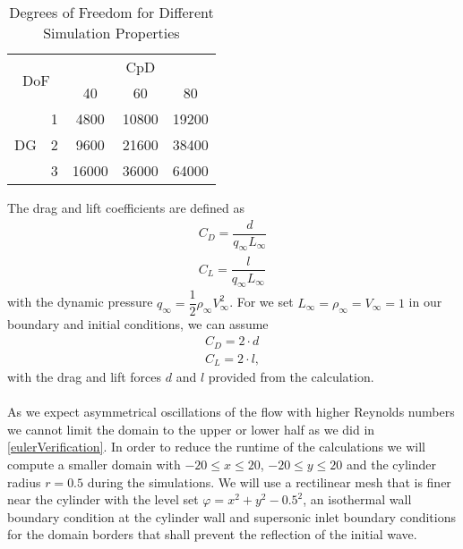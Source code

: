 	\begin{table}[htp]
		\centering
		\def\arraystretch{1.5}
			\begin{tabular}{|c|c|c|c|c|}
				\hline
				\multicolumn{2}{|c|}{\multirow{2}{*}{DoF}} & \multicolumn{3}{c|}{CpD} \\ \cline{3-5} 
				\multicolumn{2}{|c|}{}                       & 40     & 60    & 80    \\ \hline
				\multirow{3}{*}{DG}            & 1           &    4800    &    10800   &    19200    \\ \cline{2-5} 
				& 2           &    9600    &   21600    &    38400    \\ \cline{2-5} 
				& 3           &      16000  &   36000    &   64000     \\ \hline
			\end{tabular}
			\caption{Degrees of Freedom for Different Simulation Properties}	
			\label{DOF}
	\end{table}
	
	 The drag and lift coefficients are defined as
	\begin{align}
		C_D = \dfrac{d}{q_\infty L_\infty} \\
		C_L = \dfrac{l}{q_\infty L_\infty}
	\end{align}
	with the dynamic pressure $q_\infty = \dfrac{1}{2} \rho_\infty V_\infty^2$. For we set $L_\infty = \rho_\infty = V_\infty = 1$ in our boundary and initial conditions, we can assume
	\begin{align}
		C_D = 2 \cdot d \\
		C_L = 2 \cdot l,
	\end{align}
	with the drag and lift forces $d$ and $l$ provided from the calculation. \\\\
	As we expect asymmetrical oscillations of the flow with higher Reynolds numbers we cannot limit the domain to the upper or lower half as we did in \cref{eulerVerification}. In order to reduce the runtime of the calculations we will compute a smaller domain with $-20 \leq x \leq 20$, $-20 \leq y \leq 20$ and the cylinder radius $r = 0.5$ during the simulations.
	We will use a rectilinear mesh that is finer near the cylinder with the level set $\varphi = x^2 + y^2 -0.5^2$, an isothermal wall boundary condition at the cylinder wall and supersonic inlet boundary conditions for the domain borders that shall prevent the reflection of the initial wave.  \\\\
	
